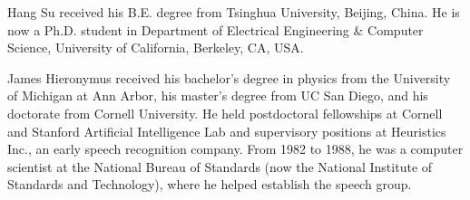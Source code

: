\documentclass[journal]{IEEEtran}
\begin{document}

%



%

 
\begin{IEEEbiography}%
{Hang Su} received his B.E. degree from Tsinghua University, Beijing, China.
He is now a Ph.D. student in Department of Electrical Engineering \& Computer Science, 
University of California, Berkeley, CA, USA.
\end{IEEEbiography}

\begin{IEEEbiography}%
{James Hieronymus} received his bachelor’s degree in physics from the University of Michigan at Ann Arbor, his master’s degree from UC San Diego, and his doctorate from Cornell University.
He held postdoctoral fellowships at Cornell and Stanford Artificial Intelligence Lab and supervisory positions at Heuristics Inc., an early speech recognition company. From 1982 to 1988, he was a computer scientist at the National Bureau of Standards (now the National Institute of Standards and Technology), where he helped establish the speech group.
\end{IEEEbiography}
\end{document}
